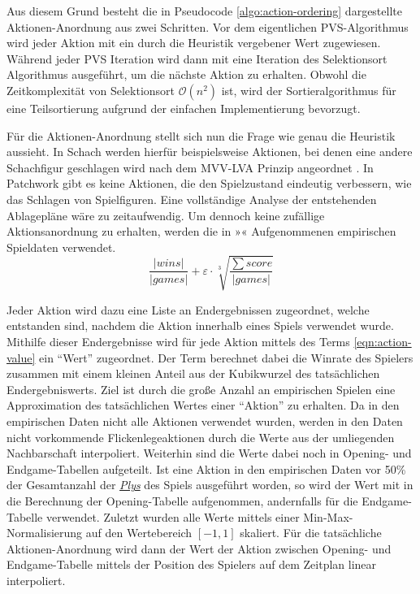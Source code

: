 Aus diesem Grund besteht die in Pseudocode \ref{algo:action-ordering} dargestellte Aktionen-Anordnung aus zwei Schritten. Vor dem eigentlichen \ac{PVS}-Algorithmus wird jeder Aktion mit  ein durch die Heuristik vergebener Wert zugewiesen. Während jeder \ac{PVS} Iteration wird dann mit  eine Iteration des Selektionsort Algorithmus ausgeführt, um die nächste Aktion zu erhalten. Obwohl die Zeitkomplexität von Selektionsort $\mathcal{O}\left(n^2\right)$ ist, wird der Sortieralgorithmus für eine Teilsortierung aufgrund der einfachen Implementierung bevorzugt.

Für die Aktionen-Anordnung stellt sich nun die Frage wie genau die Heuristik aussieht. In Schach werden hierfür beispielsweise Aktionen, bei denen eine andere Schachfigur geschlagen wird nach dem \ac{MVV-LVA} Prinzip angeordnet \cite[S. 72]{2002.FPGAMoveGenerator}. In Patchwork gibt es keine Aktionen, die den Spielzustand eindeutig verbessern, wie das Schlagen von Spielfiguren. Eine vollständige Analyse der entstehenden Ablagepläne wäre zu zeitaufwendig. Um dennoch keine zufällige Aktionsanordnung zu erhalten, werden die in »« Aufgenommenen empirischen Spieldaten verwendet.
\begin{equation}
    \label{eqn:action-value}
    \frac{|wins|}{|games|} + \varepsilon \cdot \sqrt[3]{\frac{\sum score}{|games|}}
\end{equation}

Jeder Aktion wird dazu eine Liste an Endergebnissen zugeordnet, welche entstanden sind, nachdem die Aktion innerhalb eines Spiels verwendet wurde. Mithilfe dieser Endergebnisse wird für jede Aktion mittels des Terms \ref{eqn:action-value} ein \enquote{Wert} zugeordnet. Der Term berechnet dabei die Winrate des Spielers zusammen mit einem kleinen Anteil aus der Kubikwurzel des tatsächlichen Endergebniswerts. Ziel ist durch die große Anzahl an empirischen Spielen eine Approximation des tatsächlichen Wertes einer \enquote{Aktion} zu erhalten. Da in den empirischen Daten nicht alle Aktionen verwendet wurden, werden in den Daten nicht vorkommende Flickenlegeaktionen durch die Werte aus der umliegenden Nachbarschaft interpoliert. Weiterhin sind die Werte dabei noch in Opening- und Endgame-Tabellen aufgeteilt. Ist eine Aktion in den empirischen Daten vor 50\% der Gesamtanzahl der \hyperref[text:ply]{\emph{Plys}} des Spiels ausgeführt worden, so wird der Wert mit in die Berechnung der Opening-Tabelle aufgenommen, andernfalls für die Endgame-Tabelle verwendet. Zuletzt wurden alle Werte mittels einer Min-Max-Normalisierung auf den Wertebereich $\left[-1, 1\right]$ skaliert. Für die tatsächliche Aktionen-Anordnung wird dann der Wert der Aktion zwischen Opening- und Endgame-Tabelle mittels der Position des Spielers auf dem Zeitplan linear interpoliert.

